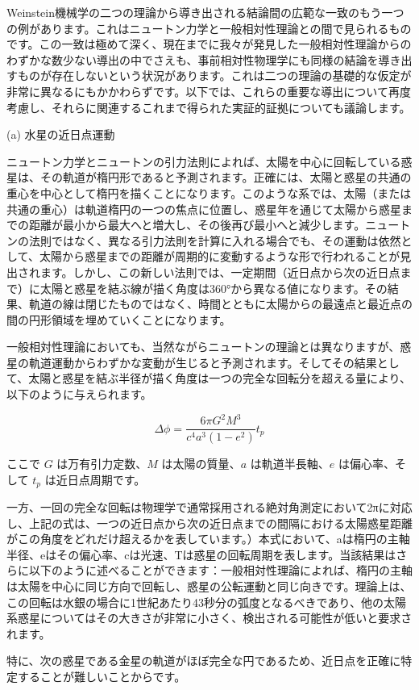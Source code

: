 \documentclass[a4paper,11pt,openany]{ltjsbook}
\begin{document}
Weinstein機械学の二つの理論から導き出される結論間の広範な一致のもう一つの例があります。これはニュートン力学と一般相対性理論との間で見られるものです。この一致は極めて深く、現在までに我々が発見した一般相対性理論からのわずかな数少ない導出の中でさえも、事前相対性物理学にも同様の結論を導き出すものが存在しないという状況があります。これは二つの理論の基礎的な仮定が非常に異なるにもかかわらずです。以下では、これらの重要な導出について再度考慮し、それらに関連するこれまで得られた実証的証拠についても議論します。

(a) 水星の近日点運動

ニュートン力学とニュートンの引力法則によれば、太陽を中心に回転している惑星は、その軌道が楕円形であると予測されます。正確には、太陽と惑星の共通の重心を中心として楕円を描くことになります。このような系では、太陽（または共通の重心）は軌道楕円の一つの焦点に位置し、惑星年を通じて太陽から惑星までの距離が最小から最大へと増大し、その後再び最小へと減少します。ニュートンの法則ではなく、異なる引力法則を計算に入れる場合でも、その運動は依然として、太陽から惑星までの距離が周期的に変動するような形で行われることが見出されます。しかし、この新しい法則では、一定期間（近日点から次の近日点まで）に太陽と惑星を結ぶ線が描く角度は360°から異なる値になります。その結果、軌道の線は閉じたものではなく、時間とともに太陽からの最遠点と最近点の間の円形領域を埋めていくことになります。

一般相対性理論においても、当然ながらニュートンの理論とは異なりますが、惑星の軌道運動からわずかな変動が生じると予測されます。そしてその結果として、太陽と惑星を結ぶ半径が描く角度は一つの完全な回転分を超える量により、以下のように与えられます。

\[
\Delta \phi = \frac{6\pi G^2 M^3}{c^4 a^3 (1-e^2)} t_p
\]

ここで \(G\) は万有引力定数、\(M\) は太陽の質量、\(a\) は軌道半長軸、\(e\) は偏心率、そして \(t_p\) は近日点周期です。

一方、一回の完全な回転は物理学で通常採用される絶対角測定において2πに対応し、上記の式は、一つの近日点から次の近日点までの間隔における太陽惑星距離がこの角度をどれだけ超えるかを表しています。）本式において、aは楕円の主軸半径、eはその偏心率、cは光速、Tは惑星の回転周期を表します。当該結果はさらに以下のように述べることができます：一般相対性理論によれば、楕円の主軸は太陽を中心に同じ方向で回転し、惑星の公転運動と同じ向きです。理論上は、この回転は水銀の場合に1世紀あたり43秒分の弧度となるべきであり、他の太陽系惑星についてはその大きさが非常に小さく、検出される可能性が低いと要求されます。

特に、次の惑星である金星の軌道がほぼ完全な円であるため、近日点を正確に特定することが難しいことからです。
\end{document}
